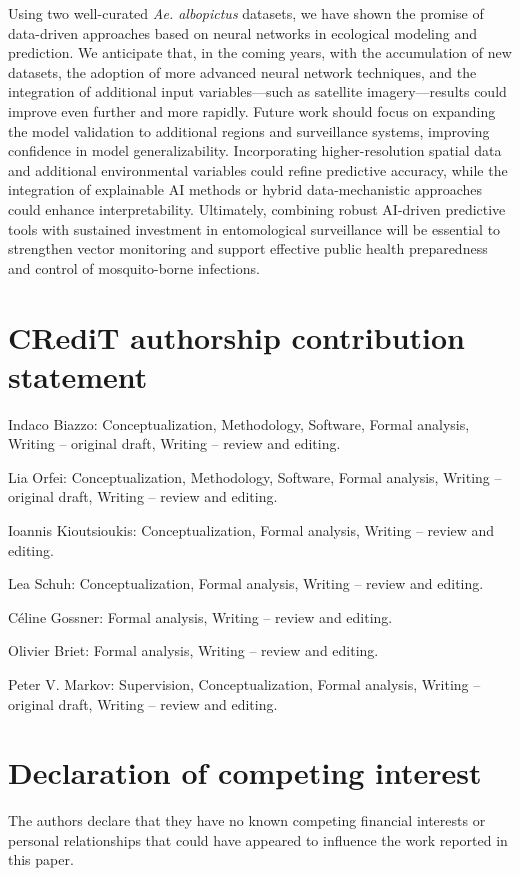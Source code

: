 \documentclass[preprint,12pt]{elsarticle}
\begin{document}
Using two well-curated \textit{Ae. albopictus} datasets, we have shown the promise of data-driven approaches based on neural networks in ecological modeling and prediction. We anticipate that, in the coming years, with the accumulation of new datasets, the adoption of more advanced neural network techniques, and the integration of additional input variables---such as satellite imagery---results could improve even further and more rapidly. Future work should focus on expanding the model validation to additional regions and surveillance systems, improving confidence in model generalizability. Incorporating higher-resolution spatial data and additional environmental variables could refine predictive accuracy, while the integration of explainable AI methods or hybrid data-mechanistic approaches could enhance interpretability. Ultimately, combining robust AI-driven predictive tools with sustained investment in entomological surveillance will be essential to strengthen vector monitoring and support effective public health preparedness and control of mosquito-borne infections.

\section*{CRediT authorship contribution statement}

Indaco Biazzo: Conceptualization, Methodology, Software, Formal analysis,
Writing -- original draft, Writing -- review and editing.

Lia Orfei: Conceptualization, Methodology, Software, Formal analysis,
Writing -- original draft, Writing -- review and editing.

Ioannis Kioutsioukis: Conceptualization, Formal analysis,
Writing -- review and editing.

Lea Schuh: Conceptualization, Formal analysis,
Writing -- review and editing.

Céline Gossner: Formal analysis, Writing -- review and editing.

Olivier Briet: Formal analysis, Writing -- review and editing.

Peter V. Markov: Supervision, Conceptualization, Formal analysis,
Writing -- original draft, Writing -- review and editing.


\section*{Declaration of competing interest}

The authors declare that they have no known competing financial interests
or personal relationships that could have appeared to influence the work
reported in this paper.
\end{document}
